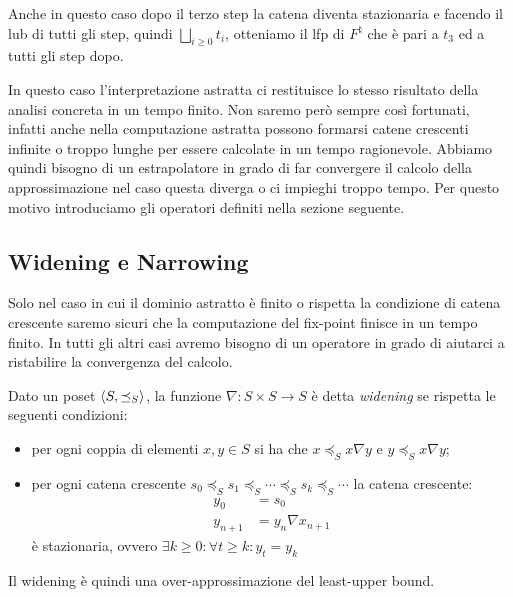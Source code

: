 Anche in questo caso dopo il terzo step la catena diventa stazionaria e facendo il lub di tutti gli step, quindi \(\bigsqcup_{i\geq0}t_i\), otteniamo il lfp di \(F^{\natural}\) che è pari a \(t_3\) ed a tutti gli step dopo.

In questo caso l'interpretazione astratta ci restituisce lo stesso risultato della analisi concreta in un tempo finito. Non saremo però sempre così fortunati, infatti anche nella computazione astratta possono formarsi catene crescenti infinite o troppo lunghe per essere calcolate in un tempo ragionevole. Abbiamo quindi bisogno di un estrapolatore in grado di far convergere il calcolo della approssimazione nel caso questa diverga o ci impieghi troppo tempo. Per questo motivo introduciamo gli operatori definiti nella sezione seguente.

\subsection{Widening e Narrowing}
Solo nel caso in cui il dominio astratto è finito o rispetta la condizione di catena crescente saremo sicuri che la computazione del fix-point finisce in un tempo finito. In tutti gli altri casi avremo bisogno di un operatore in grado di aiutarci a ristabilire la convergenza del calcolo.

\begin{definition}[Widening]
Dato un poset \(\langle S, \preceq_{S}\rangle\), la funzione \(\nabla:S\times S\rightarrow S\) è detta \textit{widening} se rispetta le seguenti condizioni:
\begin{itemize}
	\item per ogni coppia di elementi \(x, y\in S\) si ha che \(x\preceq_S x\nabla y\) e \(y\preceq_S x\nabla y\);
	\item per ogni catena crescente \(s_0\preceq_S s_1\preceq_S\cdots\preceq_S s_k\preceq_S\cdots\) la catena crescente: 
	\begin{align*}
	y_0 &= s_0\\
	y_{n+1} &= y_n\nabla x_{n+1}
	\end{align*}
	è stazionaria, ovvero \(\exists k\ge 0:\forall t\geq k: y_t = y_k\)
\end{itemize}
\end{definition}
Il widening è quindi una over-approssimazione del least-upper bound. 

